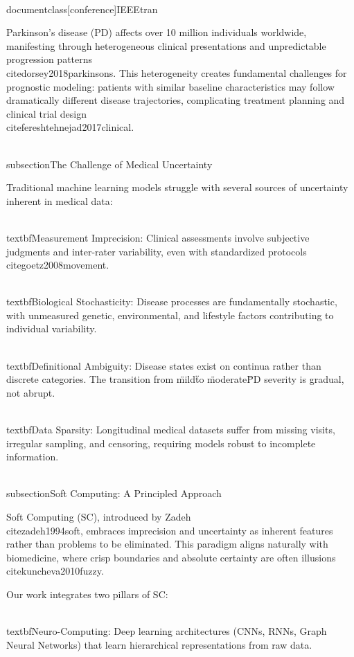 \\documentclass[conference]{IEEEtran}
\begin{document}
Parkinson's disease (PD) affects over 10 million individuals worldwide, manifesting through heterogeneous clinical presentations and unpredictable progression patterns \\cite{dorsey2018parkinsons}. This heterogeneity creates fundamental challenges for prognostic modeling: patients with similar baseline characteristics may follow dramatically different disease trajectories, complicating treatment planning and clinical trial design \\cite{fereshtehnejad2017clinical}.

\\subsection{The Challenge of Medical Uncertainty}

Traditional machine learning models struggle with several sources of uncertainty inherent in medical data:

\\textbf{Measurement Imprecision:} Clinical assessments involve subjective judgments and inter-rater variability, even with standardized protocols \\cite{goetz2008movement}.

\\textbf{Biological Stochasticity:} Disease processes are fundamentally stochastic, with unmeasured genetic, environmental, and lifestyle factors contributing to individual variability.

\\textbf{Definitional Ambiguity:} Disease states exist on continua rather than discrete categories. The transition from \"mild\" to \"moderate\" PD severity is gradual, not abrupt.

\\textbf{Data Sparsity:} Longitudinal medical datasets suffer from missing visits, irregular sampling, and censoring, requiring models robust to incomplete information.

\\subsection{Soft Computing: A Principled Approach}

Soft Computing (SC), introduced by Zadeh \\cite{zadeh1994soft}, embraces imprecision and uncertainty as inherent features rather than problems to be eliminated. This paradigm aligns naturally with biomedicine, where crisp boundaries and absolute certainty are often illusions \\cite{kuncheva2010fuzzy}.

Our work integrates two pillars of SC:

\\textbf{Neuro-Computing:} Deep learning architectures (CNNs, RNNs, Graph Neural Networks) that learn hierarchical representations from raw data.
\end{document}
